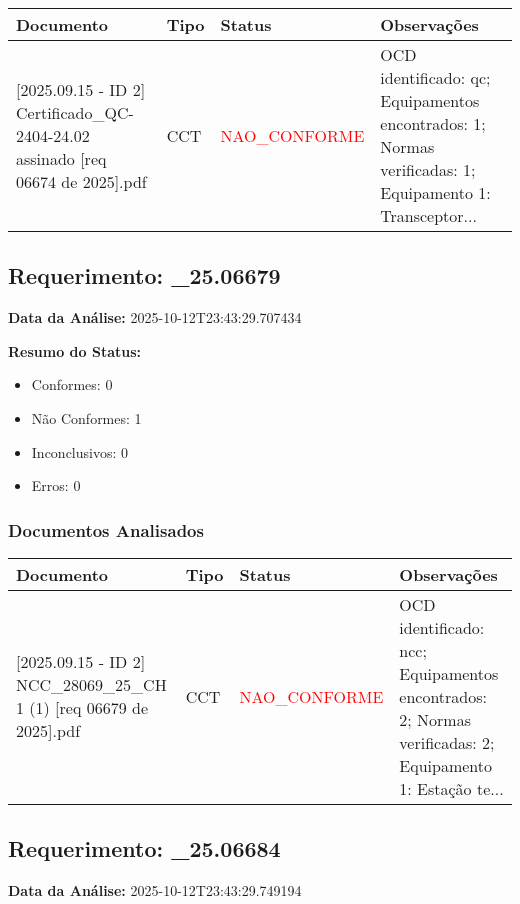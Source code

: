\documentclass[12pt,a4paper]{article}
\begin{document}
\begin{longtable}{|p{4cm}|p{2cm}|p{2cm}|p{6cm}|}
\hline
\textbf{Documento} & \textbf{Tipo} & \textbf{Status} & \textbf{Observações} \\
\hline
\endhead
[Certificado de Conformidade Técnica - CCT][2025.09.15 - ID 2] Certificado\_QC-2404-24.02 assinado [req 06674 de 2025].pdf & CCT & \textcolor{red}{NAO\_CONFORME} & OCD identificado: qc; Equipamentos encontrados: 1; Normas verificadas: 1; Equipamento 1: Transceptor... \\
\hline
\end{longtable}


\subsection{Requerimento: \_25.06679}

\textbf{Data da Análise:} 2025-10-12T23:43:29.707434

\textbf{Resumo do Status:}
\begin{itemize}
    \item Conformes: 0
    \item Não Conformes: 1
    \item Inconclusivos: 0
    \item Erros: 0
\end{itemize}

\subsubsection{Documentos Analisados}

\begin{longtable}{|p{4cm}|p{2cm}|p{2cm}|p{6cm}|}
\hline
\textbf{Documento} & \textbf{Tipo} & \textbf{Status} & \textbf{Observações} \\
\hline
\endhead
[Certificado de Conformidade Técnica - CCT][2025.09.15 - ID 2] NCC\_28069\_25\_CH 1 (1) [req 06679 de 2025].pdf & CCT & \textcolor{red}{NAO\_CONFORME} & OCD identificado: ncc; Equipamentos encontrados: 2; Normas verificadas: 2; Equipamento 1: Estação te... \\
\hline
\end{longtable}


\subsection{Requerimento: \_25.06684}

\textbf{Data da Análise:} 2025-10-12T23:43:29.749194
\end{document}
